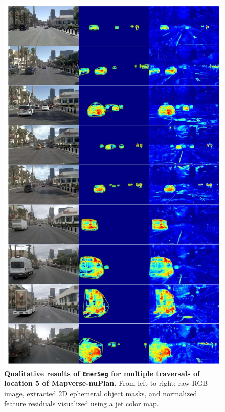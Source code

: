 \begin{figure}[ht]
    \centering
    \includegraphics[width=0.88\linewidth]{figs_compressed/EmerSeg-loc5_compressed.pdf}
    \caption{\textbf{Qualitative results of \texttt{EmerSeg} for multiple traversals of location 5 of Mapverse-nuPlan.} From left to right: raw RGB image, extracted 2D ephemeral object masks, and normalized feature residuals visualized using a jet color map.}
    \label{fig:vegas-loc5}
\end{figure}

